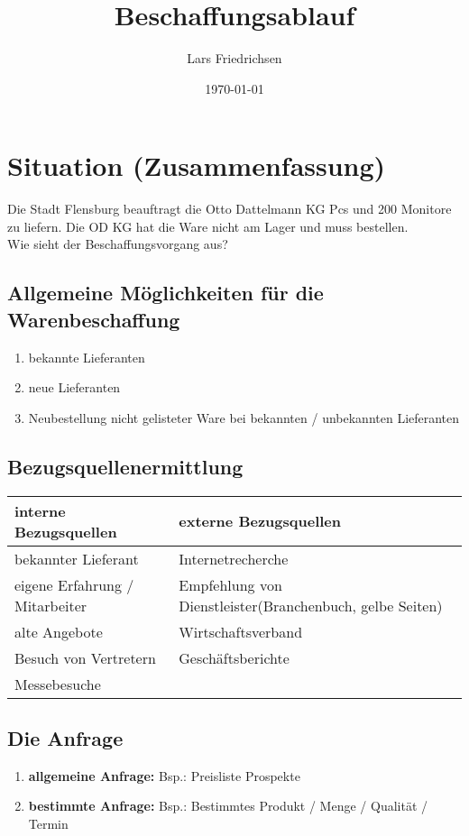 \documentclass[a4paper,11pt]{scrartcl}	%
\title{Beschaffungsablauf}
\author{Lars Friedrichsen}
\date{\today}
\begin{document}
\section{Situation (Zusammenfassung)}

Die Stadt Flensburg beauftragt die \glqq Otto Dattelmann KG Pcs und 200 Monitore zu liefern.
Die OD KG hat die Ware nicht am Lager und muss bestellen. \\[0.5cm]
Wie sieht der Beschaffungsvorgang aus?
	\subsection{Allgemeine Möglichkeiten für die Warenbeschaffung}

		\begin{enumerate}
			\item bekannte Lieferanten
			\item neue Lieferanten
			\item Neubestellung nicht gelisteter Ware bei bekannten / unbekannten Lieferanten
		\end{enumerate}
		
	\subsection{Bezugsquellenermittlung}
	
		\begin{tabular}{|l|l|}
			\hline
			interne Bezugsquellen			&	externe Bezugsquellen\\ \hline
			bekannter Lieferant				&	Internetrecherche \\ \hline
			eigene Erfahrung / Mitarbeiter	&	Empfehlung von Dienstleister(Branchenbuch, gelbe Seiten)\\ \hline
			alte Angebote					&	Wirtschaftsverband \\ \hline
			Besuch von Vertretern			&	Geschäftsberichte \\ \hline
			Messebesuche						&	\\ \hline
		\end{tabular}

	\subsection{Die Anfrage}
	
		\begin{enumerate}
			\item \textbf{allgemeine Anfrage:} Bsp.: Preisliste Prospekte
			\item \textbf{bestimmte Anfrage:} Bsp.: Bestimmtes Produkt / Menge / Qualität / Termin
		\end{enumerate}
		
\end{document}

